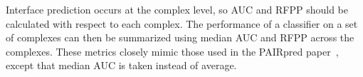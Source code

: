 Interface prediction occurs at the complex level, so AUC and RFPP should be calculated with respect to each complex. 
The performance of a classifier on a set of complexes can then be summarized using median AUC and RFPP across the complexes.
These metrics closely mimic those used in the PAIRpred paper~\cite{minhas2014}, except that median AUC is taken instead of average.
